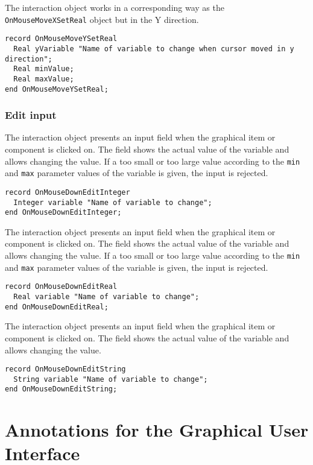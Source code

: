 The  interaction object works in a corresponding way as the \lstinline!OnMouseMoveXSetReal! object but in the Y direction.
\begin{lstlisting}[language=modelica]
record OnMouseMoveYSetReal
  Real yVariable "Name of variable to change when cursor moved in y direction";
  Real minValue;
  Real maxValue;
end OnMouseMoveYSetReal;
\end{lstlisting}

\subsubsection{Edit input}\label{edit-input}

The  interaction object presents an input field when the graphical item or component is clicked on.
The field shows the actual value of the variable and allows changing the value.
If a too small or too large value according to the \lstinline!min! and \lstinline!max! parameter values of the variable is given, the input is rejected.
\begin{lstlisting}[language=modelica]
record OnMouseDownEditInteger
  Integer variable "Name of variable to change";
end OnMouseDownEditInteger;
\end{lstlisting}

The  interaction object presents an input field when the graphical item or component is clicked on.
The field shows the actual value of the variable and allows changing the value.
If a too small or too large value according to the \lstinline!min! and \lstinline!max! parameter values of the variable is given, the input is rejected.
\begin{lstlisting}[language=modelica]
record OnMouseDownEditReal
  Real variable "Name of variable to change";
end OnMouseDownEditReal;
\end{lstlisting}

The  interaction object presents an input field when the graphical item or component is clicked on.
The field shows the actual value of the variable and allows changing the value.
\begin{lstlisting}[language=modelica]
record OnMouseDownEditString
  String variable "Name of variable to change";
end OnMouseDownEditString;
\end{lstlisting}

\section{Annotations for the Graphical User Interface}\label{annotations-for-the-graphical-user-interface}

